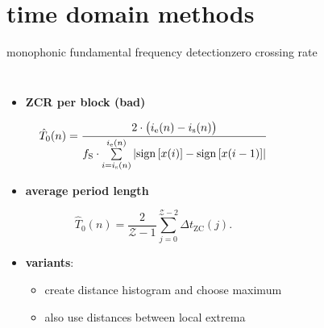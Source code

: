 	\section[time domain]{time domain methods}
	\begin{frame}{monophonic fundamental frequency detection}{zero crossing rate}
        \vspace{-6mm}
        \begin{columns}
                \begin{itemize}
                    \item	\textbf{ZCR per block (bad)}
                        \begin{footnotesize}
                        \begin{equation*}
                            \hat{T}_0(n) = \frac{2\cdot \big(i_{\mathrm{e}}(n)-i_{\mathrm{s}}(n)\big)}{f_{\mathrm{S}}\cdot\sum\limits_{i=i_{\mathrm{s}}(n)}^{i_{\mathrm{e}}(n)}{\left|\operatorname*{sign} \left[x(i)\right]-\operatorname*{sign} \left[x(i-1)\right]\right|}} 
                        \end{equation*}
                        \end{footnotesize}
                    \item<2->	\textbf{average period length}
                        \begin{footnotesize}
                        \begin{equation*}
                            \hat{T}_0(n) = \frac{2}{\mathcal{Z}-1}\sum\limits_{j=0}^{\mathcal{Z}-2}{\Delta t_\mathrm{ZC}(j)}.
                        \end{equation*}
                        \end{footnotesize}
                    \item<3->	\textbf{variants}:
                        \begin{itemize}
                            \item	create distance histogram and choose maximum
                            \item	also use distances between local extrema
                        \end{itemize}
                \end{itemize}
                \vspace{15mm}
        \end{columns}
	\end{frame}
	
